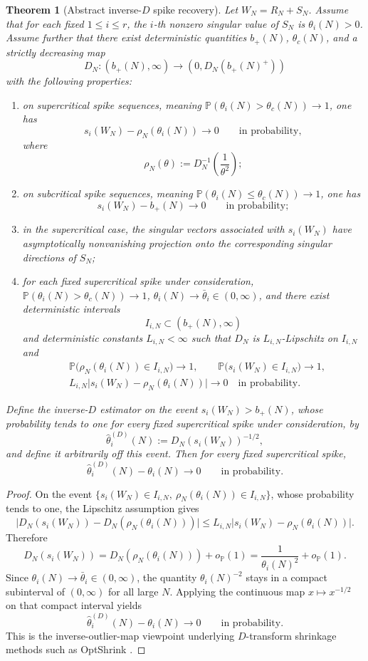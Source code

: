 \documentclass[11pt]{article}
\theoremstyle{plain}
\newtheorem{thm}{Theorem}[section]
\theoremstyle{definition}
\theoremstyle{remark}
\newcommand{\PP}{\mathbb{P}}
\newcommand{\1}{\mathbf{1}}
\begin{document}
\begin{thm}[Abstract inverse-\(D\) spike recovery]
\label{thm:abstract_inverse_D}
Let \(W_N=R_N+S_N\). Assume that for each fixed \(1\le i\le r\), the \(i\)-th nonzero singular value of \(S_N\) is \(\theta_i(N)>0\). Assume further that there exist deterministic quantities \(b_+(N)\), \(\theta_c(N)\), and a strictly decreasing map
\[
D_N:(b_+(N),\infty)\to (0,D_N(b_+(N)^+))
\]
with the following properties:
\begin{enumerate}[leftmargin=2em]
\item on supercritical spike sequences, meaning \(\PP(\theta_i(N)>\theta_c(N))\to1\), one has
\[
s_i(W_N)-\rho_N(\theta_i(N))\to0
\qquad\text{in probability},
\]
where
\[
\rho_N(\theta):=D_N^{-1}\!\left(\frac1{\theta^2}\right);
\]
\item on subcritical spike sequences, meaning \(\PP(\theta_i(N)\le \theta_c(N))\to1\), one has
\[
s_i(W_N)-b_+(N)\to0
\qquad\text{in probability};
\]
\item in the supercritical case, the singular vectors associated with \(s_i(W_N)\) have asymptotically nonvanishing projection onto the corresponding singular directions of \(S_N\);
\item for each fixed supercritical spike under consideration, \(\PP(\theta_i(N)>\theta_c(N))\to1\), \(\theta_i(N)\to\bar\theta_i\in(0,\infty)\), and there exist deterministic intervals
\[
I_{i,N}\subset (b_+(N),\infty)
\]
and deterministic constants \(L_{i,N}<\infty\) such that \(D_N\) is \(L_{i,N}\)-Lipschitz on \(I_{i,N}\) and
\[
\begin{aligned}
&\PP\big(\rho_N(\theta_i(N))\in I_{i,N}\big)\to1,
\qquad
\PP\big(s_i(W_N)\in I_{i,N}\big)\to1,\\
&L_{i,N}\big|s_i(W_N)-\rho_N(\theta_i(N))\big|\to0
\quad\text{in probability.}
\end{aligned}
\]
\end{enumerate}
Define the inverse-\(D\) estimator on the event \(s_i(W_N)>b_+(N)\), whose probability tends to one for every fixed supercritical spike under consideration, by
\[
\widehat\theta_i^{(D)}(N):=D_N(s_i(W_N))^{-1/2},
\]
and define it arbitrarily off this event. Then for every fixed supercritical spike,
\[
\widehat\theta_i^{(D)}(N)-\theta_i(N)\to0
\qquad\text{in probability}.
\]
\end{thm}

\begin{proof}
On the event \(\{s_i(W_N)\in I_{i,N},\ \rho_N(\theta_i(N))\in I_{i,N}\}\), whose probability tends to one, the Lipschitz assumption gives
\[
\big|D_N(s_i(W_N))-D_N(\rho_N(\theta_i(N)))\big|
\le
L_{i,N}\big|s_i(W_N)-\rho_N(\theta_i(N))\big|.
\]
Therefore
\[
D_N(s_i(W_N))
=
D_N(\rho_N(\theta_i(N)))+o_{\PP}(1)
=
\frac1{\theta_i(N)^2}+o_{\PP}(1).
\]
Since \(\theta_i(N)\to\bar\theta_i\in(0,\infty)\), the quantity \(\theta_i(N)^{-2}\) stays in a compact subinterval of \((0,\infty)\) for all large \(N\). Applying the continuous map \(x\mapsto x^{-1/2}\) on that compact interval yields
\[
\widehat\theta_i^{(D)}(N)-\theta_i(N)\to0
\qquad\text{in probability.}
\]
This is the inverse-outlier-map viewpoint underlying \(D\)-transform shrinkage methods such as OptShrink \cite{nadakuditi2014optshrink}.
\end{proof}
\end{document}

